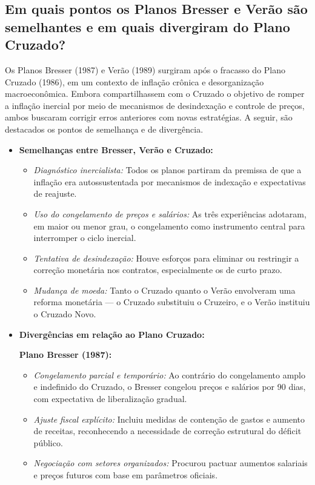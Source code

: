 \documentclass{sciposter}
\begin{document}
\begin{multicols}{3}
\section{\textbf{Em quais pontos os Planos Bresser e Verão são semelhantes e em quais divergiram do Plano Cruzado?}}

Os Planos Bresser (1987) e Verão (1989) surgiram após o fracasso do Plano Cruzado (1986), em um contexto de inflação crônica e desorganização macroeconômica. Embora compartilhassem com o Cruzado o objetivo de romper a inflação inercial por meio de mecanismos de desindexação e controle de preços, ambos buscaram corrigir erros anteriores com novas estratégias. A seguir, são destacados os pontos de semelhança e de divergência.

\begin{itemize}
    \item \textbf{ Semelhanças entre Bresser, Verão e Cruzado:}
    \begin{itemize}
        \item \textit{Diagnóstico inercialista:} Todos os planos partiram da premissa de que a inflação era autossustentada por mecanismos de indexação e expectativas de reajuste.
        \item \textit{Uso do congelamento de preços e salários:} As três experiências adotaram, em maior ou menor grau, o congelamento como instrumento central para interromper o ciclo inercial.
        \item \textit{Tentativa de desindexação:} Houve esforços para eliminar ou restringir a correção monetária nos contratos, especialmente os de curto prazo.
        \item \textit{Mudança de moeda:} Tanto o Cruzado quanto o Verão envolveram uma reforma monetária — o Cruzado substituiu o Cruzeiro, e o Verão instituiu o Cruzado Novo.
    \end{itemize}

    \item \textbf{ Divergências em relação ao Plano Cruzado:}

    \textbf{Plano Bresser (1987):}
    \begin{itemize}
        \item \textit{Congelamento parcial e temporário:} Ao contrário do congelamento amplo e indefinido do Cruzado, o Bresser congelou preços e salários por 90 dias, com expectativa de liberalização gradual.
        \item \textit{Ajuste fiscal explícito:} Incluiu medidas de contenção de gastos e aumento de receitas, reconhecendo a necessidade de correção estrutural do déficit público.
        \item \textit{Negociação com setores organizados:} Procurou pactuar aumentos salariais e preços futuros com base em parâmetros oficiais.
    \end{itemize}


\end{itemize}
\end{multicols}
\end{document}
